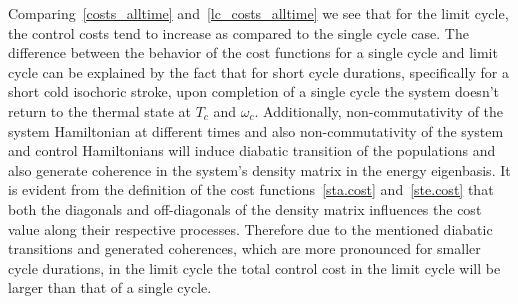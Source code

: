 \documentclass[aps,pra,twocolumn,showpacs,showkeys,groupedaddress,nobalancelastpage,nofootinbib,floatfix,superscriptaddress,longbibliography]{revtex4-2}
\begin{document}
Comparing~\cref{costs_alltime} and~\cref{lc_costs_alltime} we see that for the limit cycle, the control costs tend to increase as compared to the single cycle case. The difference between the behavior of the cost functions for a single cycle and limit cycle can be explained by the fact that for short cycle durations, specifically for a short cold isochoric stroke, upon completion of a single cycle the system doesn't return to the thermal state at $T_c$ and $\omega_c$. Additionally, non-commutativity of the system Hamiltonian at different times and also non-commutativity of the system and control Hamiltonians will induce diabatic transition of the populations and also generate coherence in the system's density matrix in the energy eigenbasis. It is evident from the definition of the cost functions~\cref{sta.cost} and~\cref{ste.cost} that both the diagonals and off-diagonals of the density matrix influences the cost value along their respective processes. Therefore due to the mentioned diabatic transitions and generated coherences, which are more pronounced for smaller cycle durations, in the limit cycle the total control cost in the limit cycle will be larger than that of a single cycle.\\
\end{document}
